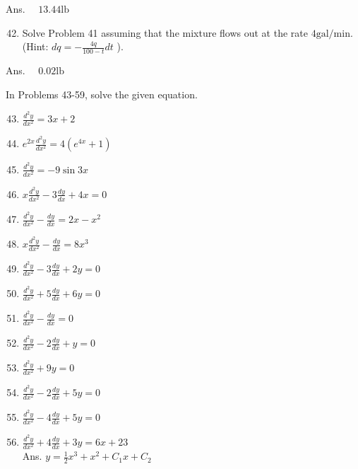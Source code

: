 \documentclass[10pt]{article}
\begin{document}
Ans. $\quad 13.44 \mathrm{lb}$

\begin{enumerate}
  \setcounter{enumi}{41}
  \item Solve Problem 41 assuming that the mixture flows out at the rate $4 \mathrm{gal} / \mathrm{min}$. (Hint: $d q=-\frac{4 q}{100-t} d t$ ).
\end{enumerate}

Ans. $\quad 0.02 \mathrm{lb}$

In Problems 43-59, solve the given equation.

\begin{enumerate}
  \setcounter{enumi}{42}
  \item $\frac{d^{2} y}{d x^{2}}=3 x+2$

  \item $e^{2 x} \frac{d^{2} y}{d x^{2}}=4\left(e^{4 x}+1\right)$

  \item $\frac{d^{2} y}{d x^{2}}=-9 \sin 3 x$

  \item $x \frac{d^{2} y}{d x^{2}}-3 \frac{d y}{d x}+4 x=0$

  \item $\frac{d^{2} y}{d x^{2}}-\frac{d y}{d x}=2 x-x^{2}$

  \item $x \frac{d^{2} y}{d x^{2}}-\frac{d y}{d x}=8 x^{3}$

  \item $\frac{d^{2} y}{d x^{2}}-3 \frac{d y}{d x}+2 y=0$

  \item $\frac{d^{2} y}{d x^{2}}+5 \frac{d y}{d x}+6 y=0$

  \item $\frac{d^{2} y}{d x^{2}}-\frac{d y}{d x}=0$

  \item $\frac{d^{2} y}{d x^{2}}-2 \frac{d y}{d x}+y=0$

  \item $\frac{d^{2} y}{d x^{2}}+9 y=0$

  \item $\frac{d^{2} y}{d x^{2}}-2 \frac{d y}{d x}+5 y=0$

  \item $\frac{d^{2} y}{d x^{2}}-4 \frac{d y}{d x}+5 y=0$

  \item $\frac{d^{2} y}{d x^{2}}+4 \frac{d y}{d x}+3 y=6 x+23$\\
Ans. $y=\frac{1}{2} x^{3}+x^{2}+C_{1} x+C_{2}$

\end{enumerate}
\end{document}
